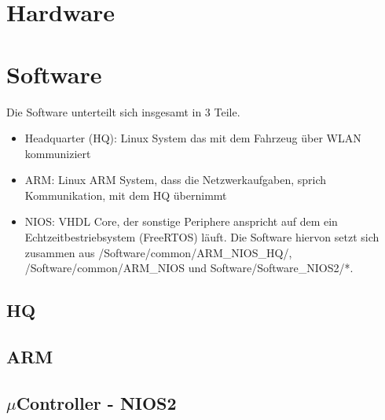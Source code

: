 \chapter{Hardware}

\chapter{Software}
Die Software unterteilt sich insgesamt in 3 Teile.
\begin{itemize}
 \item Headquarter (HQ): Linux System das mit dem Fahrzeug über WLAN kommuniziert
 \item ARM: Linux ARM System, dass die Netzwerkaufgaben, sprich Kommunikation, mit dem HQ übernimmt
 \item NIOS: VHDL Core, der sonstige Periphere anspricht auf dem ein Echtzeitbestriebsystem (FreeRTOS) läuft. Die Software hiervon setzt sich zusammen aus /Software/common/ARM\_NIOS\_HQ/, /Software/common/ARM\_NIOS und Software/Software\_NIOS2/*.
\end{itemize}

\section{HQ}


\section{ARM}



\section{$\mu$Controller - NIOS2}


